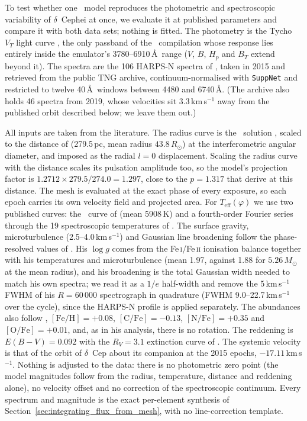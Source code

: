 To test whether one \spice\ model reproduces the photometric and spectroscopic variability of
$\delta$~Cephei at once, we evaluate it at published parameters and compare it with both data sets; nothing
is fitted. The photometry is the Tycho $V_T$ light curve \citep[62 epochs;][]{esa1997}, the only passband of
the \spips\ compilation whose response lies entirely inside the emulator's 3780--6910\,\AA\ range ($V$,
$B$, $H_p$ and $B_T$ extend beyond it). The spectra are the 106 HARPS-N \citep{harpsn} spectra of
\citet{nardetto2017harps}, taken in 2015 and retrieved from the public TNG archive, continuum-normalised
with \texttt{SuppNet} \citep{suppnet} and restricted to twelve 40\,\AA\ windows between 4480 and 6740\,\AA.
(The archive also holds 46 spectra from 2019, whose velocities sit 3.3\,km\,s$^{-1}$ away from the
published orbit described below; we leave them out.)

All inputs are taken from the literature. The radius curve is the \spips\ solution \citep{spips}, scaled to
the distance of \citet{trahin2021} (279.5\,pc, mean radius $43.8\,R_\odot$) at the interferometric angular
diameter, and imposed as the radial $l=0$ displacement. Scaling the radius curve with the distance scales its
pulsation amplitude too, so the model's projection factor is $1.2712 \times 279.5/274.0 = 1.297$, close to
the $p = 1.317$ that \citet{trahin2021} derive at this distance. The mesh is evaluated at the exact phase of
every exposure, so each epoch carries its own velocity field and projected area. For
$T_\mathrm{eff}(\varphi)$ we use two published curves: the \spips\ curve of \citet{trahin2021} (mean 5908\,K)
and a fourth-order Fourier series through the 19 spectroscopic temperatures of \citet{luck2018}. The surface
gravity, microturbulence (2.5--4.0\,km\,s$^{-1}$) and Gaussian line broadening follow the phase-resolved
values of \citet{luck2018}. His $\log g$ comes from the Fe\,\textsc{i}/Fe\,\textsc{ii} ionisation balance
together with his temperatures and microturbulence (mean 1.97, against 1.88 for $5.26\,M_\odot$ at the mean
radius), and his broadening is the total Gaussian width needed to match his own spectra; we read it as a
$1/e$ half-width and remove the 5\,km\,s$^{-1}$ FWHM of his $R = 60\,000$ spectrograph in quadrature (FWHM
9.0--22.7\,km\,s$^{-1}$ over the cycle), since the HARPS-N profile is applied separately. The abundances
also follow \citet{luck2018}, $[\mathrm{Fe/H}] = +0.08$, $[\mathrm{C/Fe}] = -0.13$, $[\mathrm{N/Fe}] = +0.35$
and $[\mathrm{O/Fe}] = +0.01$, and, as in his analysis, there is no rotation. The reddening is
$E(B-V) = 0.092$ \citep{trahin2021} with the $R_V = 3.1$ extinction curve of \citet{gordon2023}. The
systemic velocity is that of the orbit of $\delta$~Cep about its companion \citep{anderson2015} at the 2015
epochs, $-17.11$\,km\,s$^{-1}$. Nothing is adjusted to the data: there is no photometric zero point (the
model magnitudes follow from the radius, temperature, distance and reddening alone), no velocity offset and
no correction of the spectroscopic continuum. Every spectrum and magnitude is the exact per-element
synthesis of Section~\ref{sec:integrating_flux_from_mesh}, with no line-correction
template.

